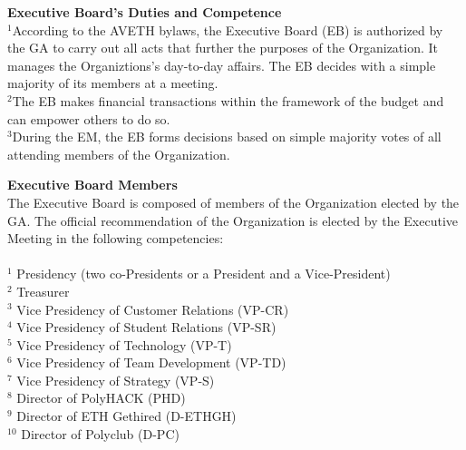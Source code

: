 \documentclass[10pt]{article}
\newcounter{qcounter}
\begin{document}
\begin{list}{{\bf Article :~}}{}
\item {\bf Executive Board's Duties and Competence}\label{EB}\\
$^{1}$According to the AVETH bylaws, the Executive Board (EB) is authorized by the GA to carry out all acts that further the purposes of the Organization. It manages the Organiztions's day-to-day affairs. The EB decides with a simple majority of its members at a meeting.\\
$^{2}$The EB makes financial transactions within the framework of the budget and can empower others to do so.\\
$^{3}$During the EM, the EB forms decisions based on simple majority votes of all attending members of the Organization.

\item {\bf Executive Board Members}\\
The Executive Board is composed of members of the Organization elected by the GA. The official recommendation of the Organization is elected by the Executive Meeting in the following competencies:\\ \\
$^{1}$ Presidency (two co-Presidents or a President and a Vice-President)\\
$^{2}$ Treasurer\\
$^{3}$ Vice Presidency of Customer Relations (VP-CR)\\
$^{4}$ Vice Presidency of Student Relations (VP-SR)\\
$^{5}$ Vice Presidency of Technology (VP-T)\\
$^{6}$ Vice Presidency of Team Development (VP-TD)\\
$^{7}$ Vice Presidency of Strategy (VP-S)\\
$^{8}$ Director of PolyHACK (PHD)\\
$^{9}$ Director of ETH Gethired (D-ETHGH)\\
$^{10}$ Director of Polyclub (D-PC)\\\\


\end{list}
\end{document}
